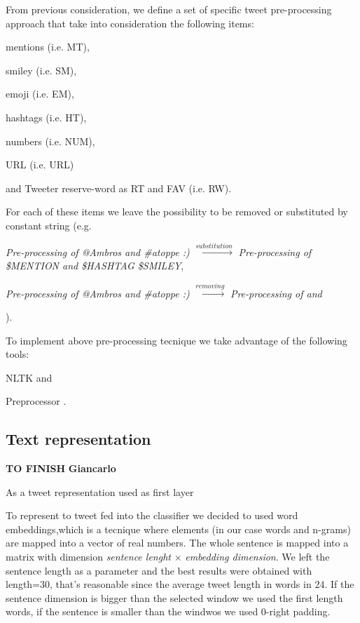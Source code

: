 From previous consideration, we define a set of specific tweet pre-processing approach that take into consideration the following items:
\begin{enumerate*}
\item mentions (i.e. MT),
\item smiley (i.e. SM),
\item emoji (i.e. EM),
\item hashtags (i.e. HT),
\item numbers (i.e. NUM),
\item URL (i.e. URL)
\item and Tweeter reserve-word as RT and FAV (i.e. RW).
\end{enumerate*}

For each of these items we leave the possibility to be removed or substituted by constant string (e.g.
\begin{enumerate*}
\item \emph{Pre-processing of @Ambros and \#atoppe :)} $\xrightarrow{substitution} $ \emph{Pre-processing of \$MENTION and \$HASHTAG \$SMILEY},
\item \emph{Pre-processing of @Ambros and \#atoppe :)} $\xrightarrow{removing} $ \emph{Pre-processing of and}
\end{enumerate*}
).

To implement above pre-processing tecnique we take advantage of the following tools:
\begin{enumerate*}
\item NLTK \cite{nltk} and 
\item Preprocessor \cite{tweets-preprocessor}.
\end{enumerate*}



\subsection{Text representation} \label{subsec:representation}

\textbf{TO FINISH}
\textbf{Giancarlo}

As a tweet representation used as first layer

To represent to tweet fed into the classifier we decided to used word embeddings,which is a tecnique where elements (in our case words and n-grams) are mapped into a vector of real numbers.
The whole sentence is mapped into a matrix with dimension \emph{sentence lenght} $\times$ \emph{embedding dimension}.
We left the sentence length as a parameter and the best results were obtained with length=30, that's reasonable since the average tweet length in words in 24.
If the sentence dimension is bigger than the selected window we used the first length words, if the sentence is smaller than the windwos we used 0-right padding.


